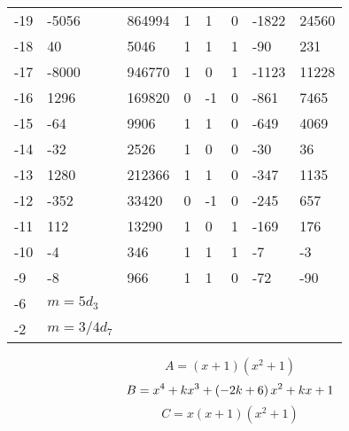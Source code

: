 \documentclass{amsart}
\begin{document}
\begin{longtable}{|l|l|l|lllll|}
-19&-5056&864994&1&1&0&-1822&24560\\
-18&40&5046&1&1&1&-90&231\\
-17&-8000&946770&1&0&1&-1123&11228\\
-16&1296&169820&0&-1&0&-861&7465\\
-15&-64&9906&1&1&0&-649&4069\\
-14&-32&2526&1&0&0&-30&36\\
-13&1280&212366&1&1&0&-347&1135\\
-12&-352&33420&0&-1&0&-245&657\\
-11&112&13290&1&0&1&-169&176\\
-10&-4&346&1&1&1&-7&-3\\
-9&-8&966&1&1&0&-72&-90\\
-6&$m=5d_{3}$&&\multicolumn{5}{c|}{}\\
-2&$m=3/4d_{7}$&&\multicolumn{5}{c|}{}\\
\hline
\end{longtable}
$$A=(x
 + 1)(x^2
 + 1)$$
$$B=x^4
 + k\*x^3
 + \left(-2\*k
 + 6\right) \*x^2
 + k\*x
 + 1$$
$$C=x(x
 + 1)(x^2
 + 1)$$
\end{document}
